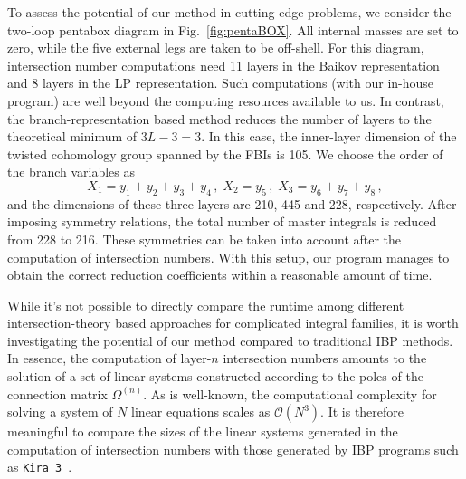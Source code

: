\documentclass[reprint,superscriptaddress]{revtex4-2}
\begin{document}
To assess the potential of our method in cutting-edge problems, we consider the two-loop pentabox diagram in Fig.~\ref{fig:pentaBOX}. All internal masses are set to zero, while the five external legs are taken to be off-shell. For this diagram, intersection number computations need 11 layers in the Baikov representation and 8 layers in the LP representation. Such computations (with our in-house program) are well beyond the computing resources available to us. In contrast, the branch-representation based method reduces the number of layers to the theoretical minimum of $3L-3 = 3$. In this case, the inner-layer dimension of the twisted cohomology group spanned by the FBIs is 105. We choose the order of the branch variables as
\begin{equation}
	X_1 = y_1 + y_2 + y_3 + y_4 \,, \; X_2 = y_5 \,, \; X_3 = y_6 + y_7 +y_8 \,,
\end{equation}
and the dimensions of these three layers are 210, 445 and 228, respectively. After imposing symmetry relations, the total number of master integrals is reduced from 228 to 216. These symmetries can be taken into account after the computation of intersection numbers. With this setup, our program manages to obtain the correct reduction coefficients within a reasonable amount of time.

While it's not possible to directly compare the runtime among different intersection-theory based approaches for complicated integral families, it is worth investigating the potential of our method compared to traditional IBP methods. In essence, the computation of layer-$n$ intersection numbers amounts to the solution of a set of linear systems constructed according to the poles of the connection matrix $\Omega^{(n)}$. As is well-known, the computational complexity for solving a system of $N$ linear equations scales as $\mathcal{O}(N^3)$. It is therefore meaningful to compare the sizes of the linear systems generated in the computation of intersection numbers with those generated by IBP programs such as \texttt{Kira~3}~\cite{Lange:2025fba}.
\end{document}
